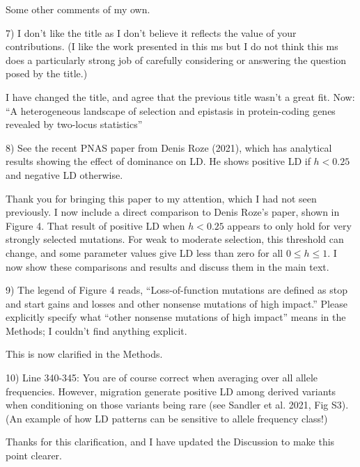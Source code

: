 \documentclass{article}
\newenvironment{response}%
  {\list{}{\leftmargin=0.5in\rightmargin=0.5in\color{blue}}\item[]}%
  {\endlist}
\begin{document}
Some other comments of my own.

7) I don't like the title as I don't believe it reflects the value of your
contributions. (I like the work presented in this ms but I do not think this ms
does a particularly strong job of carefully considering or answering the
question posed by the title.)

\begin{response}
    I have changed the title, and agree that the previous title wasn't a great
    fit. Now:
    ``A heterogeneous landscape of selection and epistasis  in
    protein-coding genes revealed by two-locus statistics''
\end{response}

8) See the recent PNAS paper from Denis Roze (2021), which has analytical
results showing the effect of dominance on LD. He shows positive LD if $h < 0.25$
and negative LD otherwise.

\begin{response}
    Thank you for bringing this paper to my attention, which I had not seen
    previously. I now include a direct comparison to Denis Roze's paper, shown
    in Figure 4. That result of positive LD when $h<0.25$ appears to only hold
    for very strongly selected mutations. For weak to moderate selection,
    this threshold can change, and some parameter values give LD less than zero
    for all $0 \leq h \leq 1$. I now show these comparisons and results and discuss
    them in the main text.
\end{response}

9) The legend of Figure 4 reads, ``Loss-of-function mutations are defined as
stop and start gains and losses and other nonsense mutations of high impact.''
Please explicitly specify what ``other nonsense mutations of high impact'' means
in the Methods; I couldn't find anything explicit.

\begin{response}
    This is now clarified in the Methods.
\end{response}

10) Line 340-345: You are of course correct when averaging over all allele
frequencies. However, migration generate positive LD among derived variants
when conditioning on those variants being rare (see Sandler et al. 2021, Fig
S3). (An example of how LD patterns can be sensitive to allele frequency
class!)

\begin{response}
    Thanks for this clarification, and I have updated the Discussion to
    make this point clearer.
\end{response}
\end{document}
